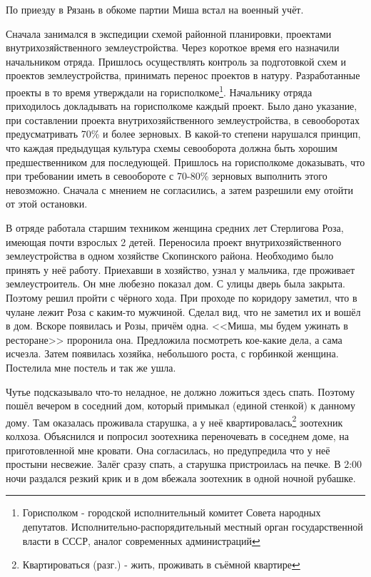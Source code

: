 По приезду в Рязань в обкоме партии Миша встал на военный учёт.

Сначала занимался в экспедиции схемой районной планировки, проектами внутрихозяйственного землеустройства. Через короткое время его назначили начальником отряда. Пришлось осуществлять контроль за подготовкой схем и проектов землеустройства, принимать перенос проектов в натуру. Разработанные проекты в то время утверждали на горисполкоме\footnote{Горисполком - городской исполнительный комитет Совета народных депутатов. Исполнительно-распорядительный местный орган государственной власти в СССР, аналог современных администраций}. Начальнику отряда приходилось докладывать на горисполкоме каждый проект. Было дано указание, при составлении проекта внутрихозяйственного землеустройства, в севооборотах предусматривать 70\% и более зерновых. В какой-то степени нарушался принцип, что каждая предыдущая культура схемы севооборота должна быть хорошим предшественником для последующей. Пришлось на горисполкоме доказывать, что при требовании иметь в севообороте с 70-80\% зерновых выполнить этого невозможно. Сначала с мнением не согласились, а затем разрешили ему отойти от этой остановки.

В отряде работала старшим техником женщина средних лет Стерлигова Роза, имеющая почти взрослых 2 детей. Переносила проект внутрихозяйственного землеустройства в одном хозяйстве Скопинского района. Необходимо было принять у неё работу. Приехавши в хозяйство, узнал у мальчика, где проживает землеустроитель. Он мне любезно показал дом. С улицы дверь была закрыта. Поэтому решил пройти с чёрного хода. При проходе по коридору заметил, что в чулане лежит Роза с каким-то мужчиной. Сделал вид, что не заметил их и вошёл в дом. Вскоре появилась и Розы, причём одна. <<Миша, мы будем ужинать в ресторане>> проронила она. Предложила посмотреть кое-какие дела, а сама исчезла. Затем появилась хозяйка, небольшого роста, с горбинкой женщина. Постелила мне постель и так же ушла. 

Чутье подсказывало что-то неладное, не должно ложиться здесь спать. Поэтому пошёл вечером в соседний дом, который примыкал (единой стенкой) к данному дому. Там оказалась проживала старушка, а у неё квартировалась\footnote{Квартироваться (разг.) - жить, проживать в съёмной квартире} зоотехник колхоза. Объяснился и попросил зоотехника переночевать в соседнем доме, на приготовленной мне кровати. Она согласилась, но предупредила что у неё простыни несвежие. Залёг сразу спать, а старушка пристроилась на печке. В 2:00 ночи раздался резкий крик и в дом вбежала зоотехник в одной ночной рубашке. 

